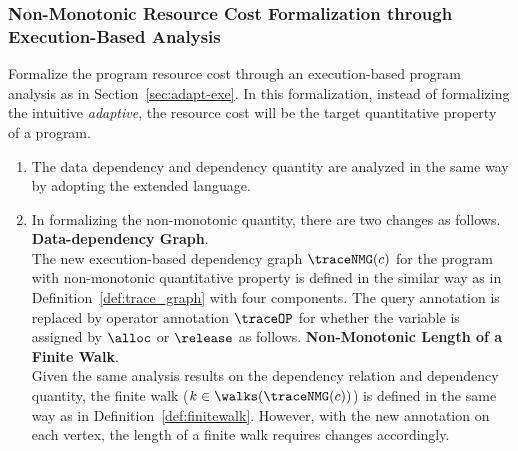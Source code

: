 \subsubsection{Non-Monotonic Resource Cost Formalization through Execution-Based Analysis} 
Formalize the program resource cost through an execution-based program analysis as in Section~\ref{sec:adapt-exe}.
In this formalization, instead of formalizing the intuitive \emph{adaptive}, the resource cost will be the
target quantitative property of a program.
\begin{enumerate}
 \item The data dependency and dependency quantity are analyzed in the same way by adopting the extended language.
 \item In formalizing the non-monotonic quantity, there are two changes as follows.
 \\
 \textbf{Data-dependency Graph}.
 \\
 The new execution-based dependency graph $\traceNMG(c)$ for the program with non-monotonic quantitative property is defined in the
 similar way as in Definition~\ref{def:trace_graph} with four components.
 The query annotation is replaced by operator annotation $\traceOP$ for whether the variable is assigned by $\alloc$ or $\release$ as follows.
 \textbf{Non-Monotonic Length of a Finite Walk}.
 \\
 Given the same analysis results on the dependency relation and dependency quantity, 
 the finite walk ($k \in \walks(\traceNMG(c))$) is defined in the same way as in Definition~\ref{def:finitewalk}. However, with the new annotation on each vertex, the length of a finite walk requires changes accordingly.
\end{enumerate}

